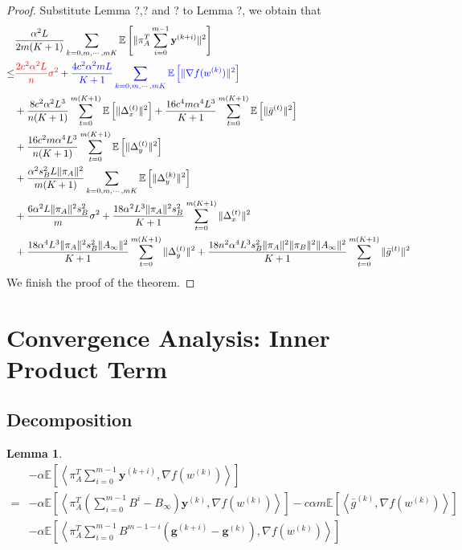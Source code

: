 \documentclass{article}
\newtheorem{lemma}[thm]{Lemma}
\newcommand{\vg}{{\mathbf{g}}}
\newcommand{\vy}{{\mathbf{y}}}
\newcommand{\EE}[1]{\mathbb{E}\left[#1\right]}
\newcommand{\norm}[1]{\| #1 \|}
\newcommand{\ip}[1]{\left\langle#1\right\rangle}
\begin{document}
\begin{proof}
  Substitute Lemma ?,? and ? to Lemma ?, we obtain that 
  \begin{align*}
    &\frac{\alpha^2L}{2m(K+1)}\sum_{k=0,m,\cdots,mK}\EE{\norm{\pi_A^T\sum_{i=0}^{m-1}\vy^{(k+i)}}^2}\\
    \leq&\textcolor{red}{ \frac{2c^2\alpha^2L}{n}\sigma^2}+ \textcolor{blue}{\frac{4c^2\alpha^2mL}{K+1}\sum_{k=0,m,\cdots,mK}\EE{\norm{\nabla f(w^{(k)})}^2}}\\&+\frac{8c^2\alpha^2L^3}{n(K+1)}\sum_{t=0}^{m(K+1)}\EE{\norm{\Delta_x^{(t)}}^2}+\frac{16c^4m\alpha^4L^3}{K+1}\sum_{t=0}^{m(K+1)}\EE{\norm{\bar{g}^{(t)}}^2}\\&+\frac{16c^2m\alpha^4L^3}{n(K+1)}\sum_{t=0}^{m(K+1)}\EE{\norm{\Delta_y^{(t)}}^2}
    \\&+\frac{\alpha^2s_B^2L\norm{\pi_A}^2}{m(K+1)}\sum_{k=0,m,\cdots,mK}\EE{\norm{\Delta_y^{(k)}}^2}
    \\&+\frac{6\alpha^2L\norm{\pi_A}^2s_B^2}{m}\sigma^2+\frac{18\alpha^2L^3\norm{\pi_A}^2s_B^2}{ K+1}\sum_{t=0}^{m(K+1)}\norm{\Delta_x^{(t)}}^2\\&+\frac{18\alpha^4L^3\norm{\pi_A}^2s_B^2\norm{A_{\infty}}^2}{ K+1}\sum_{t=0}^{m(K+1)}\norm{\Delta_y^{(t)}}^2+\frac{18n^2\alpha^4L^3s_B^2\norm{\pi_A}^2\norm{\pi_B}^2\norm{A_{\infty}}^2}{ K+1}\sum_{t=0}^{m(K+1)}\norm{\bar{g}^{(t)}}^2
  \end{align*}
  We finish the proof of the theorem.
\end{proof}

\section{Convergence Analysis: Inner Product Term}
\subsection{Decomposition}

\begin{lemma}
  \begin{align*}
    &-\alpha\EE{\ip{\pi_A^T\sum_{i=0}^{m-1}\vy^{(k+i)},\nabla f(w^{(k)})}}\\
    =&-\alpha\EE{\ip{\pi_A^T(\sum_{i=0}^{m-1}B^i-B_{\infty}) \vy^{(k)},\nabla f(w^{(k)})}}-c\alpha m\EE{\ip{\bar{g}^{(k)},\nabla f(w^{(k)})}}\\&-\alpha\EE{\ip{\pi_A^T\sum_{i=0}^{m-1}B^{m-1-i}(\vg^{(k+i)}-\vg^{(k)}),\nabla f(w^{(k)})}}
  \end{align*}
\end{lemma}
\end{document}
